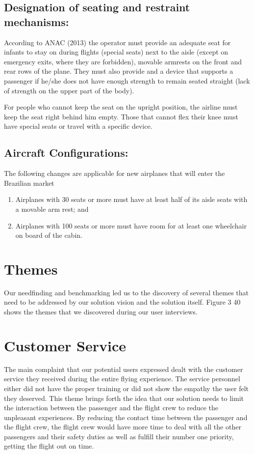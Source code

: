 \documentclass[a4paper, 12pt,conference]{new_cit_thesis}
\begin{document}
\subsection{Designation of seating and restraint mechanisms:}
According to ANAC (2013) the operator must provide an adequate seat for infants to stay on during flights (special seats) next to the aisle (except on emergency exits, where they are forbidden), movable armrests on the front and rear rows of the plane. They must also provide and a device that supports a passenger if he/she does not have enough strength to remain seated straight (lack of strength on the upper part of the body).

For people who cannot keep the seat on the upright position, the airline must keep the seat right behind him empty. Those that cannot flex their knee must have special seats or travel with a specific device.

\subsection{Aircraft Configurations:}
The following changes are applicable for new airplanes that will enter the Brazilian market
\begin{enumerate}
  \item Airplanes with 30 seats or more must have at least half of its aisle seats with a movable arm rest; and 
  \item Airplanes with 100 seats or more must have room for at least one wheelchair on board of the cabin.
\end{enumerate}

\section{Themes}
Our needfinding and benchmarking led us to the discovery of several themes that need to be addressed by our solution vision and the solution itself.  Figure 3 40 shows the themes that we discovered during our user interviews.  

\section*{Customer Service}
The main complaint that our potential users expressed dealt with the customer service they received during the entire flying experience.  The service personnel either did not have the proper training or did not show the empathy the user felt they deserved.  This theme brings forth the idea that our solution needs to limit the interaction between the passenger and the flight crew to reduce the unpleasant experiences.  By reducing the contact time between the passenger and the flight crew, the flight crew would have more time to deal with all the other passengers and their safety duties as well as fulfill their number one priority, getting the flight out on time.
\end{document}
